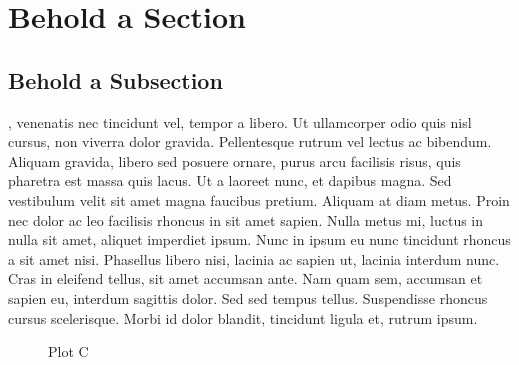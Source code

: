 \documentclass{tufte-handout}
\begin{document}
\section{Behold a Section}

\subsection{Behold a Subsection}
, venenatis nec tincidunt vel, tempor a libero. Ut ullamcorper odio quis nisl cursus, non viverra dolor gravida. Pellentesque rutrum vel lectus ac bibendum. Aliquam gravida, libero sed posuere ornare, purus arcu facilisis risus, quis pharetra est massa quis lacus. Ut a laoreet nunc, et dapibus magna. Sed vestibulum velit sit amet magna faucibus pretium. Aliquam at diam metus. Proin nec dolor ac leo facilisis rhoncus in sit amet sapien. Nulla metus mi, luctus in nulla sit amet, aliquet imperdiet ipsum. Nunc in ipsum eu nunc tincidunt rhoncus a sit amet nisi. Phasellus libero nisi, lacinia ac sapien ut, lacinia interdum nunc. Cras in eleifend tellus, sit amet accumsan ante. Nam quam sem, accumsan et sapien eu, interdum sagittis dolor. Sed sed tempus tellus. Suspendisse rhoncus cursus scelerisque. Morbi id dolor blandit, tincidunt ligula et, rutrum ipsum.


\pgfplotsset{width=10cm,compat=1.9}
\begin{figure}
\caption{Plot C}
\end{figure}
\end{document}

